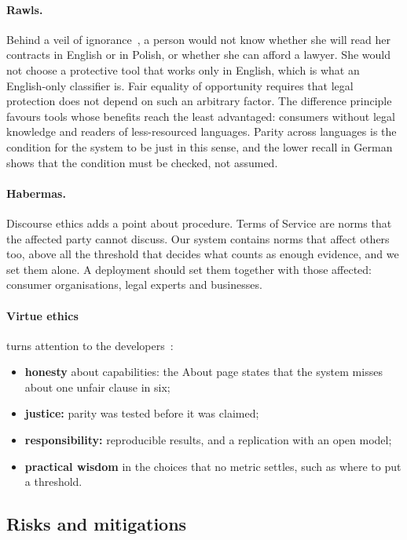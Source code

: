 \paragraph{Rawls.} Behind a veil of ignorance~\citep{rawls1971}, a person would not know whether she will read her contracts in English or in Polish, or whether she can afford a lawyer. She would not choose a protective tool that works only in English, which is what an English-only classifier is. Fair equality of opportunity requires that legal protection does not depend on such an arbitrary factor. The difference principle favours tools whose benefits reach the least advantaged: consumers without legal knowledge and readers of less-resourced languages. Parity across languages is the condition for the system to be just in this sense, and the lower recall in German shows that the condition must be checked, not assumed.

\paragraph{Habermas.} Discourse ethics adds a point about procedure. Terms of Service are norms that the affected party cannot discuss. Our system contains norms that affect others too, above all the threshold that decides what counts as enough evidence, and we set them alone. A deployment should set them together with those affected: consumer organisations, legal experts and businesses.

\paragraph{Virtue ethics} turns attention to the developers~\citep{slides_deontology}:
\begin{itemize}
  \item \textbf{honesty} about capabilities: the About page states that the system misses about one unfair clause in six;
  \item \textbf{justice:} parity was tested before it was claimed;
  \item \textbf{responsibility:} reproducible results, and a replication with an open model;
  \item \textbf{practical wisdom} in the choices that no metric settles, such as where to put a threshold.
\end{itemize}

\subsection{Risks and mitigations}
\label{sec:ethics-risks}

